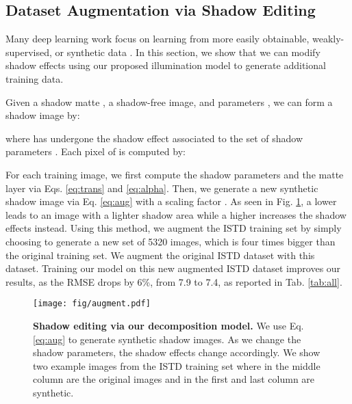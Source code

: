 \subsection{Dataset Augmentation via Shadow Editing}
\label{sec:aug}
Many deep learning work focus on learning from more easily obtainable, weakly-supervised, or synthetic data \cite{Buhmann12weak,LeICCV2017,Liu2014FashionPW,Liu2013WeaklySupervisedDC,appleShrivastavaPTSW16,m_Le-etal-ECCV18,Le_2019_CVPR_Workshops}. In this section, we show that we can modify shadow effects  using our proposed illumination model to generate additional training data. 

Given a shadow matte , a shadow-free image, and  parameters , we can form a shadow image by:


\noindent where  has undergone the shadow effect associated to the set of shadow parameters . Each pixel  of  is computed by:


For each training image, we first compute the shadow parameters and the matte layer via Eqs. \ref{eq:trans} and \ref{eq:alpha}. Then, we  generate a new synthetic shadow image via Eq. \ref{eq:aug} with a scaling factor . 
As  seen in Fig. \ref{fig:aug}, a lower  leads to an image with a lighter shadow area while a higher   increases the shadow effects instead. 
Using this method, we augment the ISTD training set by simply choosing  to generate a new set of 5320 images, which is four times bigger than the original training set.
We augment the original ISTD dataset with this dataset.
 Training our model on this new augmented ISTD dataset improves our results, as the RMSE drops by 6\%, from 7.9 to 7.4, as reported in Tab. \ref{tab:all}. 

\def\subboxsize{0.3\subFigSzab}
\begin{figure}[]
 \centering
    \texttt{[image: fig/augment.pdf]}
     \makebox[\subboxsize]{Syns. Image}
    \makebox[\subboxsize]{Real Image}
    \makebox[\subboxsize]{Syns. Image}
        \makebox[\subboxsize]{ }
    \makebox[\subboxsize]{ }
    \makebox[\subboxsize]{}
    \caption{\textbf{Shadow editing via our decomposition model.} We use Eq. \ref{eq:aug} to generate synthetic shadow images. As we change the shadow parameters, the shadow effects change accordingly. We show two example images from the ISTD training set where in the middle column are the original images and in the first and last column are synthetic.
    }
    \label{fig:aug}
\end{figure}

